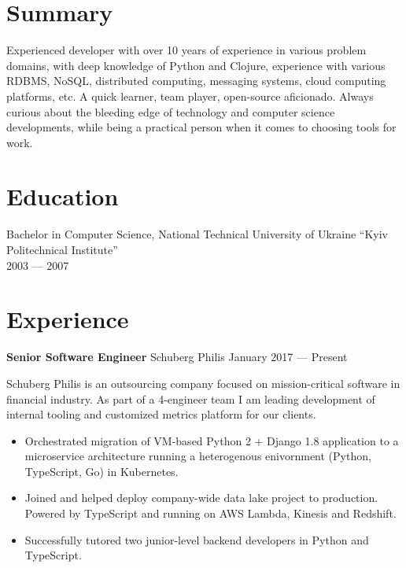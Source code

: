 \documentclass[margin]{res}
\begin{document}

\address{{\bf Mailing address} \\ Czaar Peterstraat 103B \\ 1018PE, Amsterdam \\ The Netherlands}

\address{{\bf Contacts} \\ +31 62 980 61 41 \\ contact@mishkovskyi.net \\ \href{https://github.com/mishok13}{mishok13@GitHub}}

\begin{resume}

\section{Summary}
Experienced developer with over 10 years of experience in various
problem domains, with deep knowledge of Python and Clojure, experience
with various RDBMS, NoSQL, distributed computing, messaging systems,
cloud computing platforms, etc. A quick learner, team player,
open-source aficionado. Always curious about the bleeding edge of
technology and computer science developments, while being a practical
person when it comes to choosing tools for work.

\section{Education}
Bachelor in Computer Science, National Technical University of Ukraine ``Kyiv Politechnical Institute'' \\
2003 --- 2007

\section{Experience}

{\bf Senior Software Engineer} Schuberg Philis \hfill January 2017 --- Present

Schuberg Philis is an outsourcing company focused on mission-critical
software in financial industry. As part of a 4-engineer team I am
leading development of internal tooling and customized metrics
platform for our clients.

\begin{itemize} \itemsep -1pt
\item Orchestrated migration of VM-based Python 2 + Django 1.8
  application to a microservice architecture running a heterogenous
  enivornment (Python, TypeScript, Go) in Kubernetes.
\item Joined and helped deploy company-wide data lake project to
  production. Powered by TypeScript and running on AWS Lambda, Kinesis
  and Redshift.
\item Successfully tutored two junior-level backend developers in
  Python and TypeScript.
\end{itemize}


\end{resume}
\end{document}
